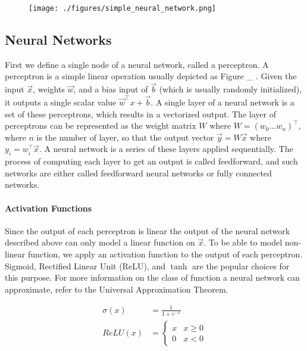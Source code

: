 \documentclass[12pt,a4paper,]{report}
\begin{document}
\begin{figure}[h]
    \texttt{[image: ./figures/simple\_neural\_network.png]}
\centering
\caption{}
\end{figure}

\hypertarget{neural-networks}{%
\subsection{Neural Networks}\label{neural-networks}}

First we define a single node of a neural network, called a perceptron.
A perceptron is a simple linear operation usually depicted as Figure \_
. Given the input \(\vec{x}\), weights \(\vec{w}\), and a bias input of
\(\vec{b}\) (which is usually randomly initialized), it outputs a single
scalar value \(\vec{w}^\intercal x + \vec{b}\). A single layer of a
neural network is a set of these perceptrons, which results in a
vectorized output. The layer of perceptrons can be represented as the
weight matrix \(W\) where \(W = (w_0 ... w_n)^\intercal\), where \(n\)
is the number of layer, so that the output vector
\(\vec{y} = W \vec{x}\) where \(y_i = w_i^\intercal \vec{x}\). A neural
network is a series of these layers applied sequentially. The process of
computing each layer to get an output is called feedforward, and such
networks are either called feedforward neural networks or fully
connected networks.

\paragraph{Activation Functions}

Since the output of each perceptron is linear the output of the neural
network described above can only model a linear function on \(\vec{x}\).
To be able to model non-linear function, we apply an activation function
to the output of each perceptron. Sigmoid, Rectified Linear Unit (ReLU),
and \(\tanh\) are the popular choices for this purpose. For more
information on the class of function a neural network can approximate,
refer to the Universal Approximation Theorem.

\begin{align}
    \sigma(x) &= \frac{1}{1 + e^{-x}} \label{eq:sigmoid} \\
    ReLU(x) &= \begin{cases}
        x & x \geq 0 \\
        0 & x < 0
    \end{cases} 
\end{align}
\end{document}
